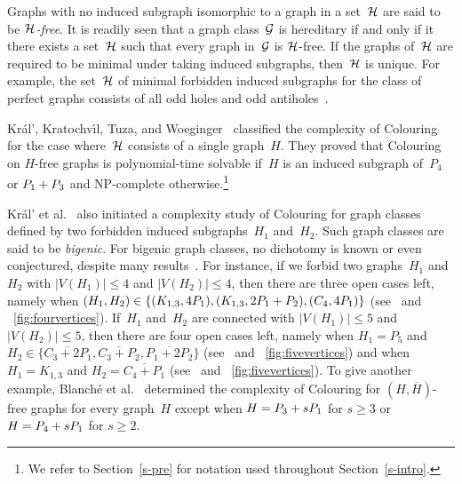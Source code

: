 \documentclass{llncs}
\newcommand{\NP}{{\sf NP}}
\begin{document}
Graphs with no induced subgraph isomorphic to a graph in a set~${\cal H}$ are said to be {\em ${\cal H}$-free}.
It is readily seen that a graph class~${\cal G}$ is hereditary if and only if it there exists a set~${\cal H}$ such that every graph in~${\cal G}$ is ${\cal H}$-free.
If the graphs of~${\cal H}$ are required to be minimal under taking induced subgraphs, then~${\cal H}$ is unique.
For example, the set~${\cal H}$ of minimal forbidden induced subgraphs for the class of perfect graphs consists of all odd holes and odd antiholes~\cite{CRST06}.

Kr\'al', Kratochv\'{\i}l, Tuza, and Woeginger~\cite{KKTW01} classified the complexity of {\sc Colouring} for the case where~${\cal H}$ consists of a single graph~$H$.
They proved that {\sc Colouring} on $H$-free graphs is polynomial-time solvable if~$H$ is an induced subgraph of~$P_4$ or $P_1+\nobreak P_3$ and \NP-complete otherwise.\footnote{We refer to Section~\ref{s-pre} for notation used throughout Section~\ref{s-intro}.}

Kr\'al' et al.~\cite{KKTW01} also initiated a complexity study of {\sc Colouring} for graph classes defined by two forbidden induced subgraphs~$H_1$ and~$H_2$.
Such graph classes are said to be {\em bigenic}.
For bigenic graph classes, no dichotomy is known or even conjectured, despite many results~\cite{BDJP16,BBKRS05,BGPS12a,CH,DDP15,DGP14,GHP,HH,HL,Hu16,KMP,KKTW01,LM15,Ma13,Ma,ML17,Sc05}.
For instance, if we forbid two graphs~$H_1$ and~$H_2$ with $|V(H_1)|\leq 4$ and $|V(H_2)|\leq 4$, then there are three open cases left, namely when 
$(H_1,H_2)\in \{(K_{1,3},4P_1),\allowbreak (K_{1,3},2P_1+\nobreak P_2),\allowbreak (C_4,4P_1)\}$ (see~\cite{LM15} and \figurename~\ref{fig:fourvertices}).
If~$H_1$ and~$H_2$ are connected with $|V(H_1)|\leq 5$ and $|V(H_2)|\leq 5$, then
there are four open cases left, namely when $H_1=P_5$ and $H_2\in \{\overline{C_3+2P_1},\overline{C_3+P_2},\overline{P_1+2P_2}\}$ (see~\cite{KMP} and \figurename~\ref{fig:fivevertices}) and when $H_1=K_{1,3}$ and $H_2=\overline{C_4+P_1}$ (see~\cite{ML17} and \figurename~\ref{fig:fivevertices}).
To give another example, Blanch\'e et al.~\cite{BDJP16} determined the complexity of {\sc Colouring} for $(H,\overline{H})$-free graphs for every graph~$H$ except when $H=P_3+\nobreak sP_1$ for $s\geq 3$ or $H=P_4+\nobreak sP_1$ for $s\geq 2$.
\end{document}
